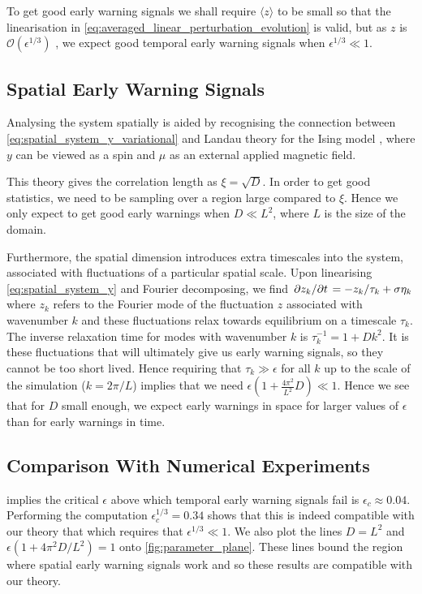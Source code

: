   To get good early warning signals we shall require $\langle z\rangle$ to be small so that the linearisation in
  \cref{eq:averaged_linear_perturbation_evolution} is valid, but as $z$ is $\mathcal{O}\left(\epsilon^{1/3}\right)$ \parencite{Berglund2006},
  we expect good temporal early warning signals when $\epsilon^{1/3} \ll 1$.

  \subsection{Spatial Early Warning Signals}
  Analysing the system spatially is aided by recognising the connection between \cref{eq:spatial_system_y_variational} and Landau theory for the Ising
  model \parencite{goldenfeld1992}, where
  $y$ can be viewed as a spin and $\mu$ as an external applied magnetic field.

  This theory gives the correlation length as $\xi = \sqrt{D}$. In order to get good statistics, we need to be sampling over a region
  large compared to $\xi$. Hence we only expect to get good early warnings when $D \ll L^2$, where $L$ is the size of the domain.

    Furthermore, the spatial dimension introduces extra timescales into the system, associated with
    fluctuations of a particular spatial scale. Upon linearising \cref{eq:spatial_system_y} and Fourier decomposing, we find
    $\pdv*{z_k}{t} = -z_k/\tau_k + \sigma\eta_k$ where $z_k$ refers to the Fourier mode of the fluctuation $z$ associated with wavenumber $k$ and 
    these fluctuations relax towards 
    equilibrium on a timescale $\tau_k$. The inverse relaxation time
    for modes with wavenumber $k$ is $\tau_k^{-1} = 1 + Dk^2$. It is these fluctuations that will ultimately
    give us early warning signals, so they cannot be too short lived. Hence requiring that 
    $\tau_k \gg \epsilon$
    for all $k$ up to the scale of the simulation ($k = 2\pi/L$) implies
    that we need $\epsilon(1+\frac{4\pi^2}{L^2} D)\ll 1$. Hence we see that for $D$ small enough, we 
    expect early warnings in space for larger values of $\epsilon$ than for early warnings in time.

    \subsection{Comparison With Numerical Experiments}
     implies the critical $\epsilon$ above which temporal early warning signals fail is $\epsilon_c \approx 0.04$.
    Performing the computation $\epsilon_c^{1/3} = 0.34$ shows that this is indeed compatible with our theory that which requires that
    $\epsilon^{1/3} \ll 1$. We also plot the lines $D = L^2$ and $\epsilon\left(1 + 4\pi^2 D/L^2\right) = 1$ onto \cref{fig:parameter_plane}.
    These lines bound the region where spatial early warning signals work and so these results are compatible with our theory.
